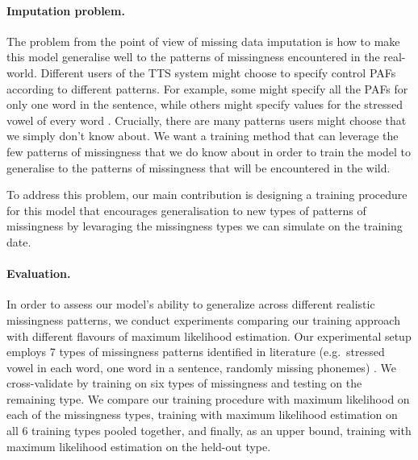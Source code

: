 \documentclass[a4paper,12pt,twoside,openright]{article}
\newcommand{\draft}[1]{\textcolor{blue}{#1}}
\begin{document}
\paragraph{Imputation problem.} The problem from the point of view of missing data imputation is how to make this model generalise well to the patterns of missingness encountered in the real-world. Different users of the TTS system might choose to specify control PAFs according to different patterns. For example, some might specify all the PAFs for only one word in the sentence, while others might specify values for the stressed vowel of every word \parencite{prosody-review:2010}. Crucially, there are many patterns users might choose that we simply don't know about. We want a training method that can leverage the few patterns of missingness that we do know about in order to train the model to generalise to the patterns of missingness that will be encountered in the wild.

To address this problem, our main contribution is designing a training procedure for this model that encourages generalisation to new types of patterns of missingness by levaraging the missingness types we can simulate on the training date.


\paragraph{Evaluation.} In order to assess our model's ability to generalize across different realistic missingness patterns, we conduct experiments comparing our training approach with different flavours of maximum likelihood estimation. Our experimental setup employs 7 types of missingness patterns identified in literature (e.g.\ stressed vowel in each word, one word in a sentence, randomly missing phonemes) \parencite{prosody-review:2010}. We cross-validate by training on six types of missingness and testing on the remaining type. We compare our training procedure with maximum likelihood on each of the missingness types, training with maximum likelihood estimation on all 6 training types pooled together, and finally, as an upper bound, training with maximum likelihood estimation on the held-out type.
\end{document}
